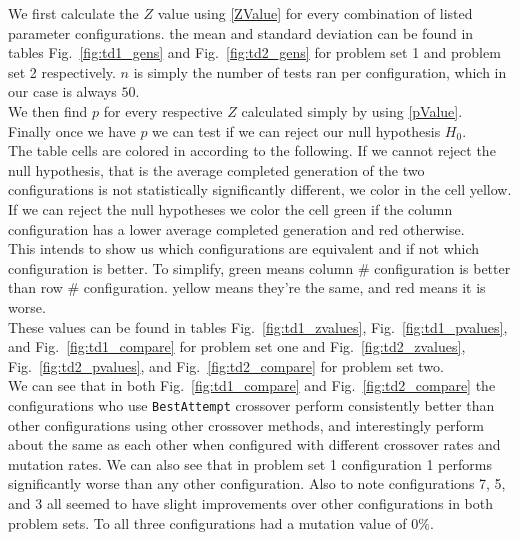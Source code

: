 \documentclass[conference]{IEEEtran}
\begin{document}
We first calculate the $Z$ value using \eqref{ZValue} for every combination of listed parameter configurations. the mean and standard deviation can be found in tables Fig.~\ref{fig:td1_gens} and Fig.~\ref{fig:td2_gens} for problem set 1 and problem set 2 respectively. $n$ is simply the number of tests ran per configuration, which in our case is always $50$.  \\

We then find $p$ for every respective $Z$ calculated simply by using \eqref{pValue}. \\

Finally once we have $p$ we can test if we can reject our null hypothesis $H_0$. \\

The table cells are colored in according to the following. If we cannot reject the null hypothesis, that is the average completed generation of the two configurations is not statistically significantly different, we color in the cell yellow. If we can reject the null hypotheses we color the cell green if the column configuration has a lower average completed generation and red otherwise.\\

This intends to show us which configurations are equivalent and if not which configuration is better. To simplify, green means column \# configuration is better than row \# configuration. yellow means they're the same, and red means it is worse. \\

These values can be found in tables Fig.~\ref{fig:td1_zvalues}, Fig.~\ref{fig:td1_pvalues}, and Fig.~\ref{fig:td1_compare} for problem set one and Fig.~\ref{fig:td2_zvalues}, Fig.~\ref{fig:td2_pvalues}, and Fig.~\ref{fig:td2_compare} for problem set two. \\


We can see that in both Fig.~\ref{fig:td1_compare} and Fig.~\ref{fig:td2_compare} the configurations who use \texttt{BestAttempt} crossover perform consistently better than other configurations using other crossover methods, and interestingly perform about the same as each other when configured with different crossover rates and mutation rates. We can also see that in problem set 1 configuration 1 performs significantly worse than any other configuration. Also to note configurations 7, 5, and 3 all seemed to have slight improvements over other configurations in both problem sets. To all three configurations had a mutation value of $0\%$.
\end{document}
